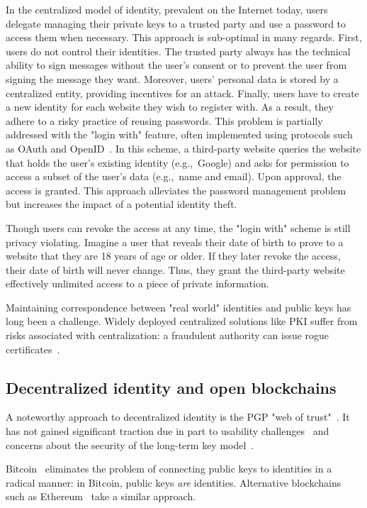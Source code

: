 In the centralized model of identity, prevalent on the Internet today, users delegate managing their private keys to a trusted party and use a password to access them when necessary.
This approach is sub-optimal in many regards.
First, users do not control their identities.
The trusted party always has the technical ability to sign messages without the user's consent or to prevent the user from signing the message they want.
Moreover, users' personal data is stored by a centralized entity, providing incentives for an attack.
Finally, users have to create a new identity for each website they wish to register with.
As a result, they adhere to a risky practice of reusing passwords.
This problem is partially addressed with the "login with" feature, often implemented using protocols such as OAuth and OpenID~\cite{Dodanduwa2018}.
In this scheme, a third-party website queries the website that holds the user's existing identity (e.g.,~Google) and asks for permission to access a subset of the user's data (e.g.,~name and email).
Upon approval, the access is granted.
This approach alleviates the password management problem but increases the impact of a potential identity theft.

Though users can revoke the access at any time, the "login with" scheme is still privacy violating.
Imagine a user that reveals their date of birth to prove to a website that they are 18 years of age or older.
If they later revoke the access, their date of birth will never change.
Thus, they grant the third-party website effectively unlimited access to a piece of private information.

Maintaining correspondence between "real world" identities and public keys has long been a challenge.
Widely deployed centralized solutions like PKI suffer from risks associated with centralization: a fraudulent authority can issue rogue certificates~\cite{Amann2017}.


\subsection{Decentralized identity and open blockchains}

A noteworthy approach to decentralized identity is the PGP "web of trust"~\cite{Feisthammel2017}.
It has not gained significant traction due in part to usability challenges~\cite{Ruoti2015} and concerns about the security of the long-term key model~\cite{Valsorda2016}.

Bitcoin~\cite{Nakamoto2008} eliminates the problem of connecting public keys to identities in a radical manner: in Bitcoin, public keys \textit{are} identities.
Alternative blockchains such as Ethereum~\cite{Buterin2014, Wood2014} take a similar approach.

